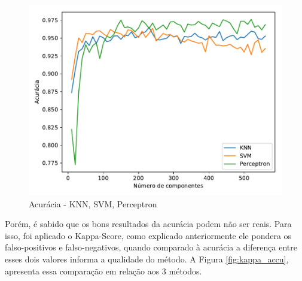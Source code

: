 \documentclass[12pt]{article}
\begin{document}
	\begin{figure}[!htb]
	\centering
	\includegraphics[width=.5\textwidth]{Todos.pdf}
	\caption{Acurácia - KNN, SVM, Perceptron}
	\label{fig:todos}
	\end{figure}

	Porém, é sabido que os bons resultados da acurácia podem não ser reais. Para isso, foi aplicado o Kappa-Score, como explicado anteriormente ele pondera os falso-positivos e falso-negativos, quando comparado à acurácia a diferença entre esses dois valores informa a qualidade do método. A Figura \ref{fig:kappa_accu}, apresenta essa comparação em relação aos 3 métodos.
\end{document}

